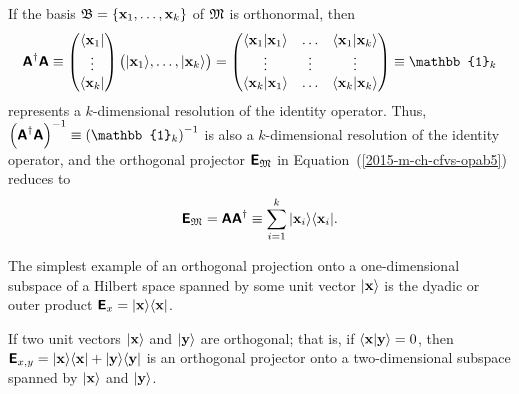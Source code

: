 If the basis ${\frak B}= \left\{{\bf x}_1,\ldots ,{\bf x}_k \right\}$ of ${\frak M}$
is orthonormal, then
\begin{equation}
\begin{split}
\textsf{\textbf{A}}^\dagger
\textsf{\textbf{A}}
\equiv
\begin{pmatrix}
\langle {\bf x}_1 \vert \\ \vdots \\ \langle {\bf x}_k \vert
\end{pmatrix}
\begin{pmatrix}
\vert {\bf x}_1\rangle , \ldots , \vert {\bf x}_k \rangle
\end{pmatrix}
=
\begin{pmatrix}
\langle {\bf x}_1 \vert {\bf x}_1\rangle   & \ldots &    \langle {\bf x}_1 \vert {\bf x}_k\rangle \\
\vdots &  \vdots &   \vdots \\
\langle {\bf x}_k \vert {\bf x}_1\rangle   & \ldots &    \langle {\bf x}_k \vert {\bf x}_k\rangle \\
\end{pmatrix}
\equiv
\mathbb{1}_k
\end{split}
\end{equation}
represents a $k$-dimensional resolution of the identity operator.
Thus, $\left(\textsf{\textbf{A}}^\dagger  \textsf{\textbf{A}} \right)^{-1}\equiv \left(\mathbb{1}_k\right)^{-1}$
is also a $k$-dimensional resolution of the identity operator,
and the orthogonal projector $\textsf{\textbf{E}}_{{\frak M}}$
in Equation~(\ref{2015-m-ch-cfvs-opab5})
reduces to
\begin{equation}
\textsf{\textbf{E}}_{{\frak M}}=
\textsf{\textbf{A}}   \textsf{\textbf{A}}^\dagger
\equiv
\sum_{i=1}^k \vert {\bf x}_i \rangle \langle {\bf x}_i \vert
.
\end{equation}



{\color{blue}
\bexample
The simplest example of an orthogonal projection onto a one-dimensional subspace of a Hilbert space
spanned by some unit vector $\vert {\bf x} \rangle$ is the dyadic or outer product
$
\textsf{\textbf{E}}_x = \vert {\bf x} \rangle  \langle {\bf x} \vert$.

If two unit vectors $\vert {\bf x} \rangle$ and $\vert {\bf y} \rangle$ are orthogonal;
that is, if $\langle {\bf x} \vert {\bf y} \rangle = 0$, then
$\textsf{\textbf{E}}_{x,y} = \vert {\bf x} \rangle  \langle {\bf x} \vert  +  \vert {\bf y} \rangle  \langle {\bf y} \vert$
is an orthogonal projector onto a two-dimensional subspace spanned by $\vert {\bf x} \rangle$ and $\vert {\bf y} \rangle$.
\eexample
}

